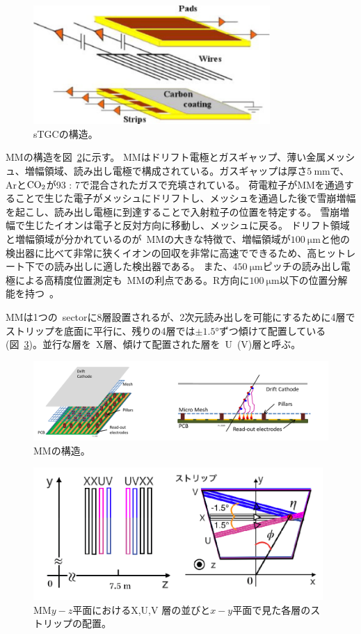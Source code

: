 \begin{figure}[h]
  \centering
  \includegraphics[clip, width=9cm]{fig/2/stgc-structure.pdf}
  \caption{sTGCの構造\cite{article:ATLASNSWTDR}。}
  \label{fig:2-24}
\end{figure}

MMの構造を図~\ref{fig:2-25}に示す。
MMはドリフト電極とガスギャップ、薄い金属メッシュ、増幅領域、読み出し電極で構成されている。ガスギャップは厚さ$\SI{5}{\mm}$で、Arと$\rm{CO_{2}}$が93 : 7で混合されたガスで充填されている。
荷電粒子がMMを通過することで生じた電子がメッシュにドリフトし、メッシュを通過した後で雪崩増幅を起こし、読み出し電極に到達することで入射粒子の位置を特定する。
雪崩増幅で生じたイオンは電子と反対方向に移動し、メッシュに戻る。
ドリフト領域と増幅領域が分かれているのが~MMの大きな特徴で、増幅領域が$\SI{100}{\um}$と他の検出器に比べて非常に狭くイオンの回収を非常に高速でできるため、高ヒットレート下での読み出しに適した検出器である。
また、$\SI{450}{\um}$ピッチの読み出し電極による高精度位置測定も~MMの利点である。R方向に$\SI{100}{\um}$以下の位置分解能を持つ~\cite{article:ATLASNSWTDR}。

MMは1つの~sectorに8層設置されるが、2次元読み出しを可能にするために4層でストリップを底面に平行に、残りの4層では$\pm \si{\ang{1.5}}$ずつ傾けて配置している(図~\ref{fig:2-26})。並行な層を~X層、傾けて配置された層を~U~(V)層と呼ぶ。

\begin{figure}[h]
  \centering
  \includegraphics[clip, width=13cm]{fig/2/mm-structure.pdf}
  \caption{MMの構造\cite{article:ATLASNSWTDR}。}
  \label{fig:2-25}
\end{figure}

\begin{figure}[h]
  \centering
  \includegraphics[clip, width=11cm]{fig/2/mm_stereolayer.png}
  \caption{MM$y−z$平面におけるX,U,V 層の並びと$x−y$平面で見た各層のストリップの配置\cite{article:kumaoka}。}
  \label{fig:2-26}
\end{figure}